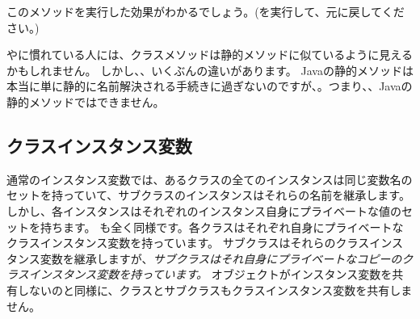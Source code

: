 \documentclass[a4paper,10pt,twoside]{book}
\begin{document}
このメソッドを実行した効果がわかるでしょう。(を実行して、元に戻してください。)

やに慣れている人には、クラスメソッドは静的メソッドに似ているように見えるかもしれません。
しかし、、いくぶんの違いがあります。
Javaの静的メソッドは本当に単に静的に名前解決される手続きに過ぎないのですが、。つまり、、Javaの静的メソッドではできません。

\subsection{クラスインスタンス変数}
通常のインスタンス変数では、あるクラスの全てのインスタンスは同じ変数名のセットを持っていて、サブクラスのインスタンスはそれらの名前を継承します。しかし、各インスタンスはそれぞれのインスタンス自身にプライベートな値のセットを持ちます。
も全く同様です。各クラスはそれぞれ自身にプライベートなクラスインスタンス変数を持っています。
サブクラスはそれらのクラスインスタンス変数を継承しますが、\emph{サブクラスはそれ自身にプライベートなコピーのクラスインスタンス変数を持っています。}
オブジェクトがインスタンス変数を共有しないのと同様に、クラスとサブクラスもクラスインスタンス変数を共有しません。
\end{document}
